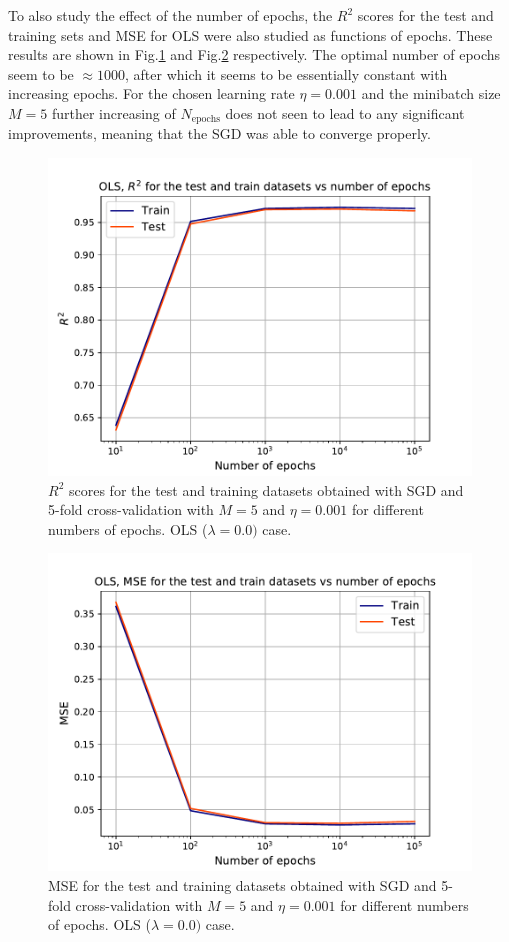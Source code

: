 \documentclass{emulateapj}
\begin{document}
To also study the effect of the number of epochs, the $R^{2}$ scores for the test and training sets and MSE for OLS were also studied as functions of epochs. These results are shown in Fig.\ref{fig: R2_OLS_epochs} and Fig.\ref{fig: MSE_OLS_epochs} respectively. The optimal number of epochs seem to be $\approx 1000$, after which it seems to be essentially constant with increasing epochs. For the chosen learning rate $\eta=0.001$ and the minibatch size $M=5$ further increasing of $N_{\mathrm{epochs}}$ does not seen to lead to any significant improvements, meaning that the SGD was able to converge properly.

\begin{figure}[h]
    \centering
    \includegraphics[width=.49\textwidth]{Figures/OLS_R2_epochs.pdf}
    \caption{$R^2$ scores for the test and training datasets obtained with SGD and 5-fold cross-validation with $M=5$ and $\eta=0.001$ for different numbers of epochs. OLS ($\lambda=0.0)$ case.}
    \label{fig: R2_OLS_epochs}
\end{figure}

\begin{figure}[h]
    \centering
    \includegraphics[width=.49\textwidth]{Figures/OLS_MSE_epochs.pdf}
    \caption{MSE for the test and training datasets obtained with SGD and 5-fold cross-validation with $M=5$ and $\eta=0.001$ for different numbers of epochs. OLS ($\lambda=0.0)$ case.}
    \label{fig: MSE_OLS_epochs}
\end{figure}
\end{document}
